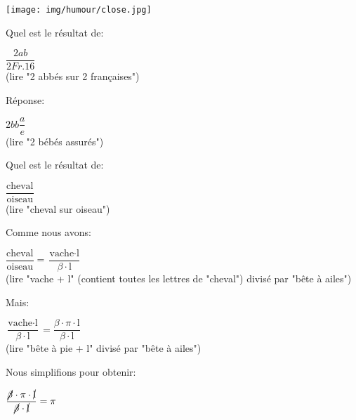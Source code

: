 	\begin{center}\underline{\hspace{5 cm}}\end{center}
	\begin{center}
		\texttt{[image: img/humour/close.jpg]}	
	\end{center}
	\begin{center}\underline{\hspace{5 cm}}\end{center}
	
	\pagebreak
	Quel est le résultat de:
	\begin{center}
		 $\dfrac{2ab}{2Fr.16}$\\
		(lire "2 abbés sur 2 françaises")
	\end{center} 

	Réponse: 
	\begin{center}
		$2bb \dfrac{a}{e}$\\
		(lire "2 bébés assurés")
	\end{center} 
	\begin{center}\underline{\hspace{5 cm}}\end{center}
	
	Quel est le résultat de: 
	\begin{center}
	 $\dfrac{\text{cheval}}{\text{oiseau}}$\\
	(lire "cheval sur oiseau")
	 \end{center} 
	
	Comme nous avons: 
	\begin{center}
	 $\dfrac{\text{cheval}}{\text{oiseau}}=\dfrac{\text{vache} \cdot \text{l}}{\beta \cdot \text{l}}$\\
	(lire "vache + l" (contient toutes les lettres de "cheval") divisé par "bête à ailes") 
	 \end{center} 
	
	Mais: 
	\begin{center}
	 $\dfrac{\text{vache} \cdot \text{l}}{\beta \cdot \text{l}}=\dfrac{\beta \cdot \pi \cdot \text{l}}{\beta \cdot \text{l}}$\\
	(lire "bête à pie + l" divisé par "bête à ailes")  
	 \end{center}
	
	Nous simplifions pour obtenir: 
	\begin{center}
	 $\dfrac{\cancel{\beta} \cdot \pi \cdot \cancel{\text{l}}}{\cancel{\beta} \cdot \cancel{\text{l}}}=\pi$  
	 \end{center}
	
